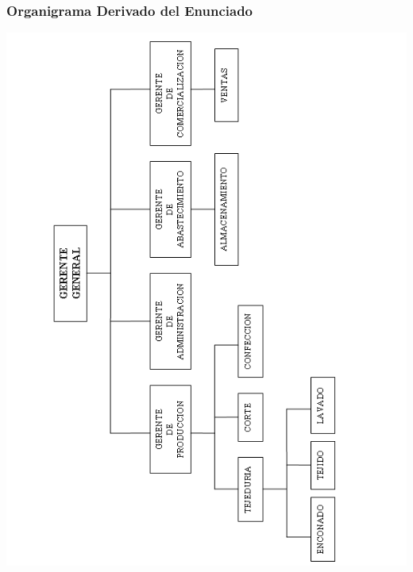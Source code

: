 \documentclass[a4paper,10pt,titlepage]{article}
\begin{document}
\subsubsection{Organigrama Derivado del Enunciado}
\begin{center} \includegraphics[scale=0.75]{./dollyDiag.png} \end{center}

\newpage
\end{document}
